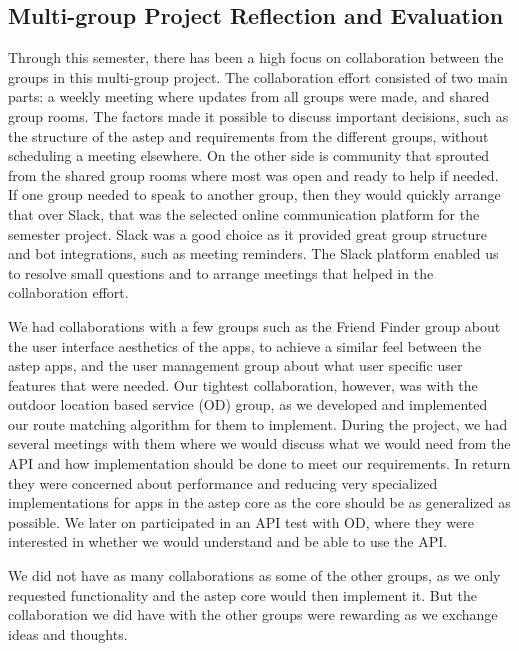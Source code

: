 \subsection{Multi-group Project Reflection and Evaluation}
Through this semester, there has been a high focus on collaboration between the groups in this multi-group project.
The collaboration effort consisted of two main parts: a weekly meeting where updates from all groups were made, and shared group rooms.
The factors made it possible to discuss important decisions, such as the structure of the \gls{astep} and requirements from the different groups, without scheduling a meeting elsewhere.
On the other side is community that sprouted from the shared group rooms where most was open and ready to help if needed.
If one group needed to speak to another group, then they would quickly arrange that over Slack, that was the selected online communication platform for the semester project.
Slack was a good choice as it provided great group structure and bot integrations, such as meeting reminders. 
The Slack platform enabled us to resolve small questions and to arrange meetings that helped in the collaboration effort.

We had collaborations with a few groups such as the Friend Finder group about the user interface aesthetics of the apps, to achieve a similar feel between the \gls{astep} apps, and the user management group about what user specific user features that were needed.
Our tightest collaboration, however, was with the outdoor location based service (OD) group, as we developed and implemented our route matching algorithm for them to implement.
During the project, we had several meetings with them where we would discuss what we would need from the API and how implementation should be done to meet our requirements.
In return they were concerned about performance and reducing very specialized implementations for apps in the \gls{astep} core as the core should be as generalized as possible.
We later on participated in an API test with OD, where they were interested in whether we would understand and be able to use the API.

We did not have as many collaborations as some of the other groups, as we only requested functionality and the \gls{astep} core would then implement it.
But the collaboration we did have with the other groups were rewarding as we exchange ideas and thoughts.

